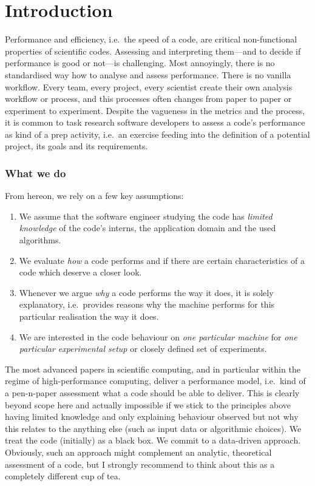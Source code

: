 \chapter{Introduction}

Performance and efficiency, i.e.~the speed of a code, are critical non-functional properties of scientific codes.
Assessing and interpreting them---and to decide if performance is good or not---is challenging.
Most annoyingly, there is no standardised way how to analyse and assess performance.
There is no vanilla workflow.
Every team, every project, every scientist create their own analysis workflow or
process, and this processes often changes from paper to paper or experiment to experiment.
Despite the vagueness in the metrics and the process, it is common to task research software developers to assess a code's performance as kind of a prep activity, i.e.~an exercise feeding into
the definition of a potential project, its goals and its requirements.


\subsection*{What we do}

From hereon, we rely on a few key assumptions:

\begin{enumerate}
  \item We assume that the software engineer studying the code has \emph{limited knowledge} of the code's interns, the application domain and the used algorithms. 
  \item We evaluate \emph{how} a code performs and if there are certain characteristics of a code which deserve a closer look.
  \item Whenever we argue \emph{why} a code performs the way it does, it is solely explanatory, i.e.~provides reasons why the machine performs for this particular realisation the way it does.
  \item We are interested in the code behaviour on \emph{one particular machine} for \emph{one particular experimental setup} or closely defined set of experiments.
\end{enumerate}


\noindent
The most advanced papers in scientific computing, and in particular within the regime of high-performance computing, deliver a performance model, i.e.~kind of a pen-n-paper assessment what a code should be able to deliver.
This is clearly beyond scope here and actually impossible if we stick to the principles above having limited knowledge and only explaining behaviour observed but not why this relates to the anything else (such as input data or algorithmic choices).
We treat the code (initially) as a black box.
We commit to a data-driven approach.
Obviously, such an approach might complement an analytic, theoretical assessment of a code, but I strongly recommend to think about this as a completely different cup of tea.


